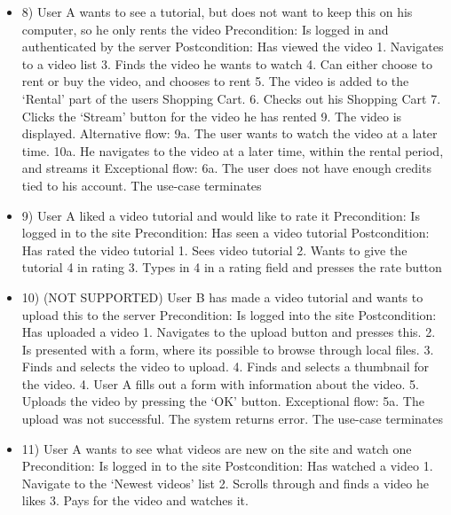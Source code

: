 \begin{itemize}
\item 8)
User A wants to see a tutorial, but does not want to keep this on his computer, so he only rents the video
\newline Precondition: Is logged in and authenticated by the server
\newline Postcondition: Has viewed the video
    1. Navigates to a video list
    3. Finds the video he wants to watch
    4. Can either choose to rent or buy the video, and chooses to rent
    5. The video is added to the ‘Rental’ part of the users Shopping Cart.
    6. Checks out his Shopping Cart
    7. Clicks the ‘Stream’ button for the video he has rented
    9. The video is displayed. 
\newline Alternative flow:
    9a. The user wants to watch the video at a later time.
    10a. He navigates to the video at a later time, within the rental period, and streams it
\newline Exceptional flow:
    6a. The user does not have enough credits tied to his account. The use-case terminates 

\item 9)
User A liked a video tutorial and would like to rate it
\newline Precondition: Is logged in to the site
\newline Precondition: Has seen a video tutorial
\newline Postcondition: Has rated the video tutorial
1. Sees video tutorial
    2. Wants to give the tutorial 4 in rating
    3. Types in 4 in a rating field and presses the rate button

\item 10) (NOT SUPPORTED)
User B has made a video tutorial and wants to upload this to the server
\newline Precondition: Is logged into the site
\newline Postcondition: Has uploaded a video
    1. Navigates to the upload button and presses this.
    2. Is presented with a form, where its possible to browse through local files.
    3. Finds and selects the video to upload.
    4. Finds and selects a thumbnail for the video.
    4. User A fills out a form with information about the video.
    5. Uploads the video by pressing the ‘OK’ button. 
\newline Exceptional flow:
    5a. The upload was not successful. The system returns error. The use-case terminates

\item 11)
User A wants to see what videos are new on the site and watch one
\newline Precondition: Is logged in to the site
\newline Postcondition: Has watched a video
    1. Navigate to the ‘Newest videos’ list
    2. Scrolls through and finds a video he likes
    3. Pays for the video and watches it.


\end{itemize}
